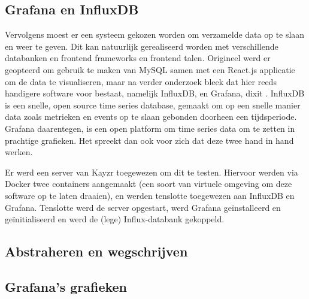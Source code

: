 \subsection{Grafana en InfluxDB}
\label{sec:grafanaAndInflux}

Vervolgens moest er een systeem gekozen worden om verzamelde data op te slaan en weer te geven. Dit kan natuurlijk gerealiseerd worden met verschillende databanken en frontend frameworks en frontend talen. Origineel werd er geopteerd om gebruik te maken van MySQL samen met een React.js applicatie om de data te visualiseren, maar na verder onderzoek bleek dat hier reeds handigere software voor bestaat, namelijk InfluxDB, en Grafana, dixit \textcite{Hill2015}. InfluxDB is een snelle, open source time series database, gemaakt om op een snelle manier data zoals metrieken en events op te slaan gebonden doorheen een tijdsperiode. Grafana daarentegen, is een open platform om time series data om te zetten in prachtige grafieken. Het spreekt dan ook voor zich dat deze twee hand in hand werken.

Er werd een server van Kayzr toegewezen om dit te testen. Hiervoor werden via Docker twee containers aangemaakt (een soort van virtuele omgeving om deze software op te laten draaien), en werden tenslotte toegewezen aan InfluxDB en Grafana. Tenslotte werd de server opgestart, werd Grafana geïnstalleerd en geïnitialiseerd en werd de (lege) Influx-databank gekoppeld. 

\subsection{Abstraheren en wegschrijven}
\label{sec:abstraction}




\subsection{Grafana's grafieken}
\label{sec:graphs}




